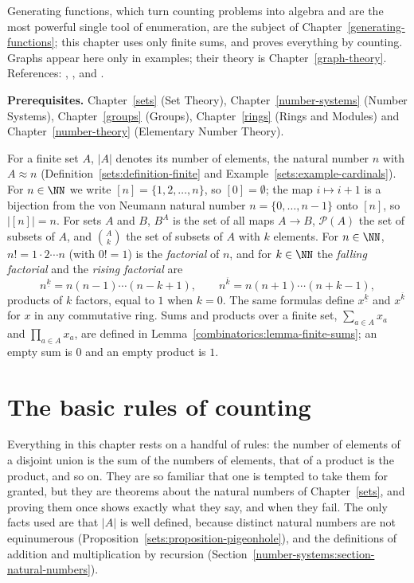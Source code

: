 Generating functions, which turn counting problems into algebra and are the most powerful single tool of enumeration, are the subject of Chapter~\ref{generating-functions}; this chapter uses only
finite sums, and proves everything by counting. Graphs appear here only in examples; their theory is Chapter~\ref{graph-theory}. References: \cite{stanley-ec1}, \cite{van-lint-wilson},
\cite{aigner-ziegler} and \cite{andrews-partitions}.

\noindent\textbf{Prerequisites.} Chapter~\ref{sets} (Set Theory), Chapter~\ref{number-systems} (Number Systems), Chapter~\ref{groups} (Groups), Chapter~\ref{rings} (Rings and Modules) and
Chapter~\ref{number-theory} (Elementary Number Theory).

\begin{notation}\label{combinatorics:notation-basic}
For a finite set $A$, $|A|$ denotes its number of elements, the natural number $n$ with $A \approx n$ (Definition~\ref{sets:definition-finite} and Example~\ref{sets:example-cardinals}). For
$n \in \NN$ we write $[n] = \{1, 2, \ldots, n\}$, so $[0] = \emptyset$; the map $i \mapsto i + 1$ is a bijection from the von Neumann natural number $n = \{0, \ldots, n - 1\}$ onto $[n]$, so
$|[n]| = n$. For sets $A$ and $B$, $B^A$ is the set of all maps $A \to B$, $\mathcal{P}(A)$ the set of subsets of $A$, and $\binom{A}{k}$ the set of subsets of $A$ with $k$ elements. For
$n \in \NN$, $n! = 1 \cdot 2 \cdots n$ (with $0! = 1$) is the \emph{factorial} of $n$, and for $k \in \NN$ the \emph{falling factorial} and the \emph{rising factorial} are
\[
n^{\underline{k}} = n(n - 1) \cdots (n - k + 1), \qquad n^{\overline{k}} = n(n + 1) \cdots (n + k - 1),
\]
products of $k$ factors, equal to $1$ when $k = 0$. The same formulas define $x^{\underline{k}}$ and $x^{\overline{k}}$ for $x$ in any commutative ring. Sums and products over a finite set,
$\sum_{a \in A}x_a$ and $\prod_{a \in A}x_a$, are defined in Lemma~\ref{combinatorics:lemma-finite-sums}; an empty sum is $0$ and an empty product is $1$.
\end{notation}

\section{The basic rules of counting}\label{combinatorics:section-basic-rules}

Everything in this chapter rests on a handful of rules: the number of elements of a disjoint union is the sum of the numbers of elements, that of a product is the product, and so on. They are so
familiar that one is tempted to take them for granted, but they are theorems about the natural numbers of Chapter~\ref{sets}, and proving them once shows exactly what they say, and when they fail.
The only facts used are that $|A|$ is well defined, because distinct natural numbers are not equinumerous (Proposition~\ref{sets:proposition-pigeonhole}), and the definitions of addition and
multiplication by recursion (Section~\ref{number-systems:section-natural-numbers}).

